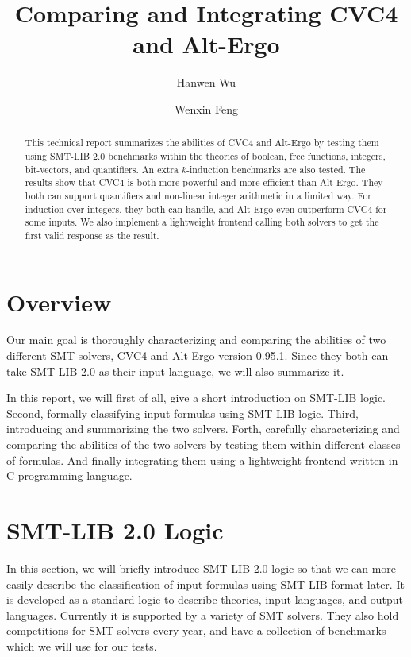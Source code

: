 \documentclass[10pt,letter]{article}
\title{\bf Comparing and Integrating CVC4 and Alt-Ergo}
\author{Hanwen Wu}
\author{Wenxin Feng}
\affil{Department of Computer Science\\Boston University\\
\small\texttt{\{hwwu,wenxinf\}@bu.edu}}
\theoremstyle{definition}
\begin{document}
\maketitle

\begin{abstract}
This technical report summarizes the abilities of CVC4 and Alt-Ergo by testing them using SMT-LIB 2.0 benchmarks within the theories of boolean, free functions, integers, bit-vectors, and quantifiers. An extra $k$-induction benchmarks are also tested. The results show that CVC4 is both more powerful and more efficient than Alt-Ergo. They both can support quantifiers and non-linear integer arithmetic in a limited way. For induction over integers, they both can handle, and Alt-Ergo even outperform CVC4 for some inputs. We also implement a lightweight frontend calling both solvers to get the first valid response as the result.
\end{abstract}
\section{Overview}




Our main goal is thoroughly characterizing and comparing the abilities of two different SMT solvers, CVC4\cite{barrett:cvc4:2011} and Alt-Ergo\cite{alt-ergo} version 0.95.1. Since they both can take SMT-LIB 2.0\cite{bs2010} as their input language, we will also summarize it.

In this report, we will first of all, give a short introduction on SMT-LIB logic. Second, formally classifying input formulas using SMT-LIB logic. Third, introducing and summarizing the two solvers. Forth, carefully characterizing and comparing the abilities of the two solvers by testing them within different classes of formulas. And finally integrating them using a lightweight frontend written in C programming language.

\section{SMT-LIB 2.0 Logic}

In this section, we will briefly introduce SMT-LIB 2.0 logic so that we can more easily describe the classification of input formulas using SMT-LIB format later. It is developed as a standard logic to describe theories, input languages, and output languages. Currently it is supported by a variety of SMT solvers. They also hold competitions for SMT solvers every year, and have a collection of benchmarks which we will use for our tests.
\end{document}
